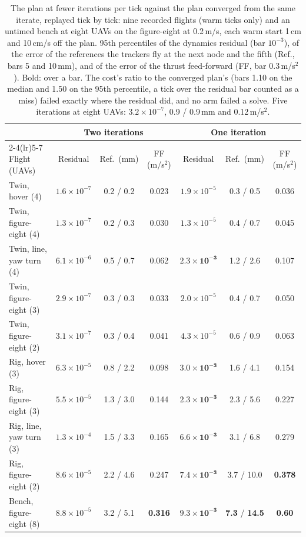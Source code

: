 \begin{table}[htbp]
\centering
\footnotesize
\setlength{\tabcolsep}{2.5pt}
\caption[The plan at fewer iterations]{The plan at fewer iterations per tick against the plan converged from the same
iterate, replayed tick by tick: nine recorded flights (warm ticks only) and an untimed bench at eight UAVs on the
figure-eight at 0.2\,m/s, each warm start 1\,cm and 10\,cm/s off the plan. 95th percentiles of the dynamics residual (bar $10^{-3}$), of the error of the
references the trackers fly at the next node and the fifth (Ref., bars 5 and 10\,mm), and of the error of the thrust
feed-forward (FF, bar 0.3\,m/s$^2$). Bold: over a bar. The cost's ratio to the converged plan's (bars 1.10 on the median
and 1.50 on the 95th percentile, a tick over the residual bar counted as a miss) failed exactly where the residual did,
and no arm failed a solve. Five iterations at eight UAVs: $3.2 \times 10^{-7}$, 0.9 / 0.9\,mm and 0.12\,m/s$^2$.}
\label{tab:scale_quality}
\begin{tabular}{lcccccc}
\toprule
 & \multicolumn{3}{c}{Two iterations} & \multicolumn{3}{c}{One iteration} \\
\cmidrule(lr){2-4}\cmidrule(lr){5-7}
Flight (UAVs) & Residual & Ref.\ (mm) & FF (m/s$^2$) & Residual & Ref.\ (mm) & FF (m/s$^2$) \\
\midrule
Twin, hover (4) & $1.6{\times}10^{-7}$ & 0.2 / 0.2 & 0.023 & $1.9{\times}10^{-5}$ & 0.3 / 0.5 & 0.036 \\
Twin, figure-eight (4) & $1.3{\times}10^{-7}$ & 0.2 / 0.3 & 0.030 & $1.3{\times}10^{-5}$ & 0.4 / 0.7 & 0.045 \\
Twin, line, yaw turn (4) & $6.1{\times}10^{-6}$ & 0.5 / 0.7 & 0.062 & $\mathbf{2.3{\times}10^{-3}}$ & 1.2 / 2.6 & 0.107 \\
Twin, figure-eight (3) & $2.9{\times}10^{-7}$ & 0.3 / 0.3 & 0.033 & $2.0{\times}10^{-5}$ & 0.4 / 0.7 & 0.050 \\
Twin, figure-eight (2) & $3.1{\times}10^{-7}$ & 0.3 / 0.4 & 0.041 & $4.3{\times}10^{-5}$ & 0.6 / 0.9 & 0.063 \\
\addlinespace
Rig, hover (3) & $6.3{\times}10^{-5}$ & 0.8 / 2.2 & 0.098 & $\mathbf{3.0{\times}10^{-3}}$ & 1.6 / 4.1 & 0.154 \\
Rig, figure-eight (3) & $5.5{\times}10^{-5}$ & 1.3 / 3.0 & 0.144 & $\mathbf{2.3{\times}10^{-3}}$ & 2.3 / 5.6 & 0.227 \\
Rig, line, yaw turn (3) & $1.3{\times}10^{-4}$ & 1.5 / 3.3 & 0.165 & $\mathbf{6.6{\times}10^{-3}}$ & 3.1 / 6.8 & 0.279 \\
Rig, figure-eight (2) & $8.6{\times}10^{-5}$ & 2.2 / 4.6 & 0.247 & $\mathbf{7.4{\times}10^{-3}}$ & 3.7 / 10.0 & \textbf{0.378} \\
\addlinespace
Bench, figure-eight (8) & $8.8{\times}10^{-5}$ & 3.2 / 5.1 & \textbf{0.316} & $\mathbf{9.3{\times}10^{-3}}$ & \textbf{7.3} / \textbf{14.5} & \textbf{0.60} \\
\bottomrule
\end{tabular}
\end{table}

